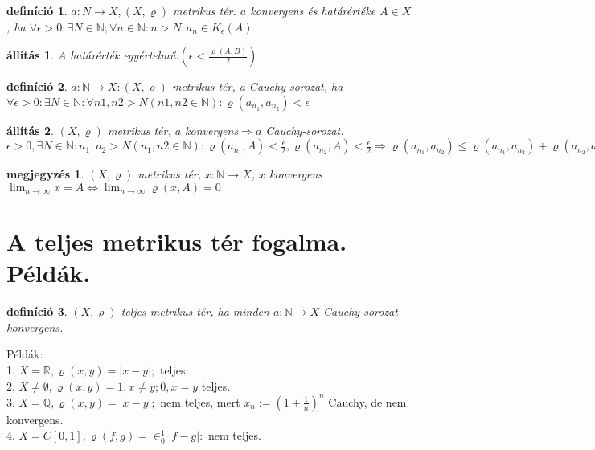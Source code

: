 \documentclass{article}
\newcommand{\ek}{\Longleftrightarrow}
\newcommand{\R}{\mathbb{R}}
\newcommand{\Q}{\mathbb{Q}}
\newcommand{\N}{\mathbb{N}}
\newcommand{\n}{\rightarrow}
\newcommand{\nn}{\Rightarrow}
\newcommand{\di}{\displaystyle}
\theoremstyle{magyar}
\newtheorem{de}{definíció}[section]
\newtheorem{me}{megjegyzés}[section]
\newtheorem{al}{állítás}[section]
\begin{document}
\begin{de}
  $a:N\n X, (X,\varrho)$ metrikus tér. $a$ konvergens és határértéke $A\in X$, ha $\forall\epsilon>0:\exists N\in\N; \forall n\in\N:n>N:a_n\in K_\epsilon(A)$
\end{de}
\begin{al}
  $A$ határérték egyértelmű.$(\epsilon<\di\frac{\varrho(A,B)}{2})$
\end{al}
\begin{de}
  $a:\N\n X: (X,\varrho)$ metrikus tér, a Cauchy-sorozat, ha $\forall\epsilon>0: \exists N\in\N:\forall n1,n2>N(n1,n2\in\N):\varrho(a_{n_1},a_{n_2})<\epsilon$
\end{de}
\begin{al}
  $(X,\varrho)$ metrikus tér, $a$ konvergens$\nn a$ Cauchy-sorozat.\\
  $\epsilon>0,\exists N\in\N:n_1,n_2>N(n_1,n2\in\N):\varrho(a_{n_1},A)<\di\frac{\epsilon}{2},\varrho(a_{n_2},A)<\di\frac{\epsilon}{2}\nn\varrho(a_{n_1},a_{n_2})\le\varrho(a_{n_1},a_{n_2})+\varrho(a_{n_2},a_{n_2})<\epsilon$
\end{al}
\begin{me}
  $(X,\varrho)$ metrikus tér, $x:\N\n X$, $x$ konvergens $\di\lim_{n\n\infty}x=A\ek\lim_{n\n\infty}{\varrho(x,A)}=0$
\end{me}
\newpage
\section{A teljes metrikus tér fogalma. Példák.}
\begin{de}
  $(X,\varrho)$ teljes metrikus tér, ha minden $a:\N\n X$ Cauchy-sorozat konvergens.
\end{de}
Példák:\\
1. $X=\R,\varrho(x,y)=|x-y|; $ teljes\\
2. $X\not=\emptyset, \varrho(x,y)={1, x\not=y;0, x=y}$ teljes.\\
3. $X=\Q,\varrho(x,y)=|x-y|;$ nem teljes, mert $x_n:=\di(1+\frac1{n})^n$ Cauchy, de nem konvergens.\\
4. $X=C[0,1], \varrho(f,g)=\di\in_0^1{|f-g|}:$ nem teljes.
\newpage
\end{document}
